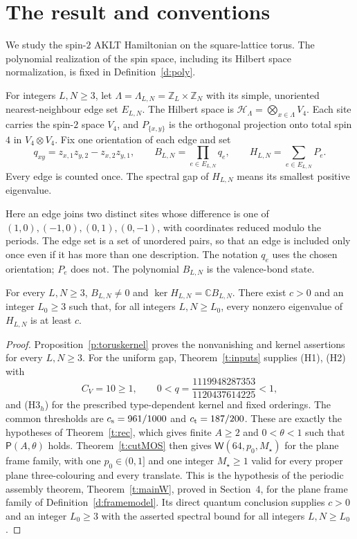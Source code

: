 \section{The result and conventions}\label{s:result}

We study the spin-\(2\) AKLT Hamiltonian on the square-lattice torus.
The polynomial realization of the spin space, including its Hilbert
space normalization, is fixed in Definition~\ref{d:poly}.

\begin{definition}\label{d:model}
For integers \(L,N\ge3\), let \(\Lambda=\Lambda_{L,N}=\mathbb Z_L\times\mathbb Z_N\)
with its simple, unoriented nearest-neighbour edge set \(E_{L,N}\).
The Hilbert space is \(\mathcal H_\Lambda=\bigotimes_{x\in\Lambda}V_4\).
Each site carries the spin-\(2\) space \(V_4\), and \(P_{\{x,y\}}\)
is the orthogonal projection onto total spin \(4\) in \(V_4\otimes V_4\).
Fix one orientation of each edge and set
\[
 q_{xy}=z_{x,1}z_{y,2}-z_{x,2}z_{y,1},\qquad
 B_{L,N}=\prod_{e\in E_{L,N}}q_e,\qquad
 H_{L,N}=\sum_{e\in E_{L,N}}P_e.
\]
Every edge is counted once. The spectral gap of \(H_{L,N}\) means its
smallest positive eigenvalue.
\end{definition}

Here an edge joins two distinct sites whose difference is one of
\((1,0),(-1,0),(0,1),(0,-1)\), with coordinates reduced modulo the
periods. The edge set is a set of unordered pairs, so that an edge
is included only once even if it has more than one description.
The notation \(q_e\) uses the chosen orientation; \(P_e\) does not.
The polynomial \(B_{L,N}\) is the valence-bond state.

\begin{theorem}\label{t:main}
For every \(L,N\ge3\), \(B_{L,N}\ne0\) and
\(\ker H_{L,N}=\mathbb C B_{L,N}\).
There exist \(c>0\) and an integer \(L_0\ge3\) such that, for all
integers \(L,N\ge L_0\), every nonzero eigenvalue of \(H_{L,N}\)
is at least \(c\).
\end{theorem}

\begin{proof}
Proposition~\ref{p:toruskernel} proves the nonvanishing and kernel
assertions for every \(L,N\ge3\). For the uniform gap,
Theorem~\ref{t:inputs} supplies (H1), (H2) with
\[
 C_V=10\ge1,\qquad
 0<q=\frac{1119948287353}{1120437614225}<1,
\]
and (H3\(_h\)) for the prescribed type-dependent kernel and fixed
orderings. The common thresholds are \(c_{\rm s}=961/1000\) and
\(c_{\rm t}=187/200\).
These are exactly the hypotheses of Theorem~\ref{t:rec}, which
gives finite \(A\ge2\) and \(0<\theta<1\) such that
\(\mathsf P(A,\theta)\) holds.
Theorem~\ref{t:cutMOS} then gives
\(\mathsf W(64,p_0,M_\star)\) for the plane frame family, with
one \(p_0\in(0,1]\) and one integer \(M_\star\ge1\) valid for
every proper plane three-colouring and every translate.
This is the hypothesis of the periodic assembly theorem,
Theorem~\ref{t:mainW}, proved in Section~4, for the plane frame
family of Definition~\ref{d:framemodel}. Its direct quantum
conclusion supplies \(c>0\) and an integer \(L_0\ge3\) with the
asserted spectral bound for all integers \(L,N\ge L_0\).
\end{proof}

